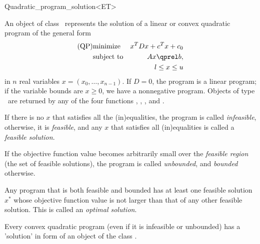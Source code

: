 \begin{ccRefClass}{Quadratic_program_solution<ET>}


\ccDefinition
An object of class \ccRefName\ represents the solution of a linear or 
convex quadratic program of the general form
\begin{eqnarray*}
\mbox{(QP)}& \mbox{minimize} & x^{T}Dx+c^{T}x+c_0 \\
&\mbox{subject to}   & Ax\qprel b, \\
&                    & l \leq x \leq u
\end{eqnarray*}
in $n$ real variables $x=(x_0,\ldots,x_{n-1})$. If $D=0$, the program is
a linear program; if the variable bounds are $x\geq 0$, we have a 
nonnegative program. Objects of type \ccRefName\ are returned by any of 
the four functions 
, ,
, and
. 

If there is no $x$ that satisfies all the (in)equalities,
the program is called \emph{infeasible}, otherwise, it is \emph{feasible},
and any $x$ that satisfies all (in)equalities is called a \emph{feasible
solution}. 

If the objective function value becomes arbitrarily small over the
\emph{feasible region} (the set of feasible solutions), the program
is called \emph{unbounded}, and \emph{bounded} otherwise. 

Any program that is both feasible and bounded has at least one
feasible solution $x^*$ whose objective function value is not larger
than that of any other feasible solution. This is called an 
\emph{optimal solution}.

Every convex quadratic program (even if it is infeasible or unbounded)
has a 'solution' in form of an object of the class \ccRefName.

\ccTypes






\end{ccRefClass}
